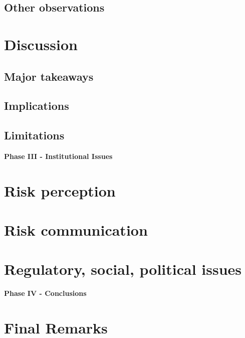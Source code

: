 \documentclass[11pt,a4paper]{article}
\begin{document}
\subsection{Other observations}

\newpage

\section{Discussion} 
\subsection{Major takeaways}
\subsection{Implications}
\subsection{Limitations}

\newpage

\begin{center}
    \textbf{\Large Phase III - Institutional Issues}
\end{center}

\newpage

\section{Risk perception}

\newpage

\section{Risk communication}

\newpage

\section{Regulatory, social, political issues}

\newpage

\begin{center}
    \textbf{\Large Phase IV - Conclusions}
\end{center}

\newpage

\section{Final Remarks}
\end{document}
